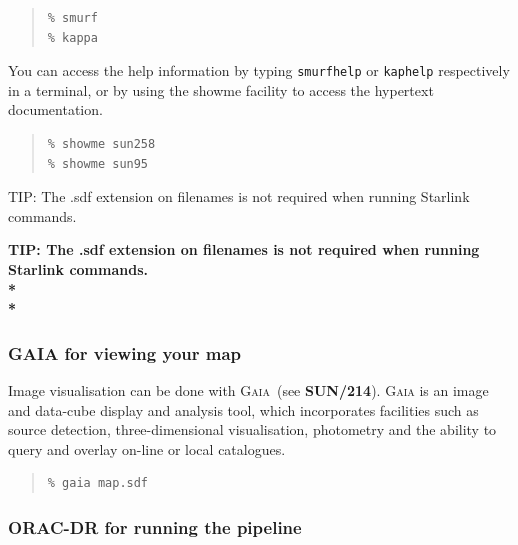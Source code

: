 \documentclass[twoside,11pt]{article}
\newenvironment{latexonly}{}{}
\newcommand{\xref}[3]{#1}
\renewcommand{\_}{\texttt{\symbol{95}}}
\newenvironment{fmpage}[1]{\begin{lrbox}{\fmbox}\begin{minipage}{#1}}{\end{minipage}\end{lrbox}\fbox{\usebox{\fmbox}}}
\newenvironment{myquote}{
   \color{MidnightBlue}\begin{quote}\begin{small}}{
   \end{small}\end{quote}
}
\newcommand{\gaia}{\xref{\textsc{Gaia}}{sun214}{}}
\newcommand{\task}[1]{\textsf{#1}}
\newcommand{\gaiasun}{\xref{\textbf{SUN/214}}{sun214}{}}
\renewenvironment{myquote}{
      \begin{quote}\begin{small}}{
      \end{small}\end{quote}
   }
\begin{document}
\begin{myquote}
\begin{verbatim}
% smurf
% kappa
\end{verbatim}
\end{myquote}

You can access the help information by typing \texttt{smurfhelp} or
\texttt{kaphelp} respectively in a terminal, or by using the
\task{showme} facility to access the hypertext documentation.

\begin{myquote}
\begin{verbatim}
% showme sun258
% showme sun95
\end{verbatim}
\end{myquote}


\begin{latexonly}
\begin{center}
\begin{fmpage}{0.95\linewidth}
\vspace{0.1cm}
TIP: The .sdf extension on filenames is not required when running Starlink commands.
\end{fmpage}
\end{center}
\end{latexonly}

\begin{htmlonly}
\textbf{TIP: The .sdf extension on filenames is not required when running Starlink commands.\\*\\*}
\end{htmlonly}
\vspace{0.5cm}

\subsubsection{GAIA for viewing your map}

Image visualisation can be done with \gaia\ (see \gaiasun). \textsc{Gaia} is an
image and data-cube display and analysis tool, which incorporates facilities such
as source detection, three-dimensional visualisation, photometry and the ability
to query and overlay on-line or local catalogues.
\begin{myquote}
\begin{verbatim}
% gaia map.sdf
\end{verbatim}
\end{myquote}

\subsubsection{ORAC-DR for running the pipeline}
\end{document}
